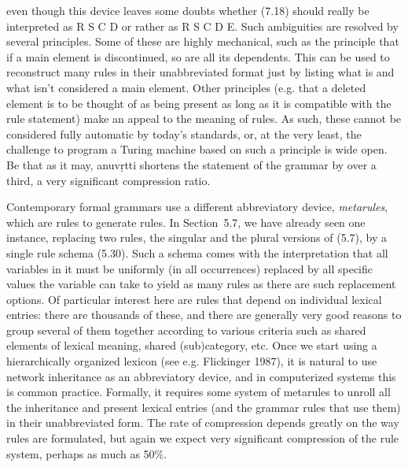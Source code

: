 \noindent
even though this device leaves some doubts whether (7.18) should really be
interpreted as R S C D or rather as R S C D E. Such ambiguities are resolved
by several principles. Some of these are highly mechanical, such as the
principle that if a main element is discontinued, so are all its dependents.
This can be used to reconstruct many rules in their unabbreviated format just
by listing what is and what isn't considered a main element. Other principles
(e.g. that a deleted element is to be thought of as being present as long as
it is compatible with the rule statement) make an appeal to the meaning of
rules.  As such, these cannot be considered fully automatic by today's
standards, or, at the very least, the challenge to program a Turing machine
based on such a principle is wide open. Be that as it may, anuv\d{r}tti
shortens the statement of the grammar by over a third, a very significant
compression ratio.

Contemporary formal grammars use a different abbreviatory device, {\it
  metarules}, which are rules to generate rules. In
Section~5.7, we have already seen one instance, replacing two rules, the
singular and the plural versions of (5.7), by a single rule schema
(5.30). Such a schema comes with the interpretation that all variables in it
must be uniformly (in all occurrences) replaced by all specific values the
variable can take to yield as many rules as there are such replacement
options. Of particular interest here are rules that depend on individual
lexical entries: there are thousands of these, and there are generally very
good reasons to group several of them together according to various criteria
such as shared elements of lexical meaning, shared (sub)category, etc. Once we
start using a hierarchically organized lexicon (see e.g. Flickinger 1987), it
is natural to use network inheritance as an abbreviatory device, and in
computerized systems this is common practice. Formally, it requires some
system of metarules to unroll all the inheritance and present lexical entries
(and the grammar rules that use them) in their unabbreviated form. The rate of
compression depends greatly on the way rules are formulated, but again we
expect very significant compression of the rule system, perhaps as much as
50\%.\nocite{Flickinger:1987}

